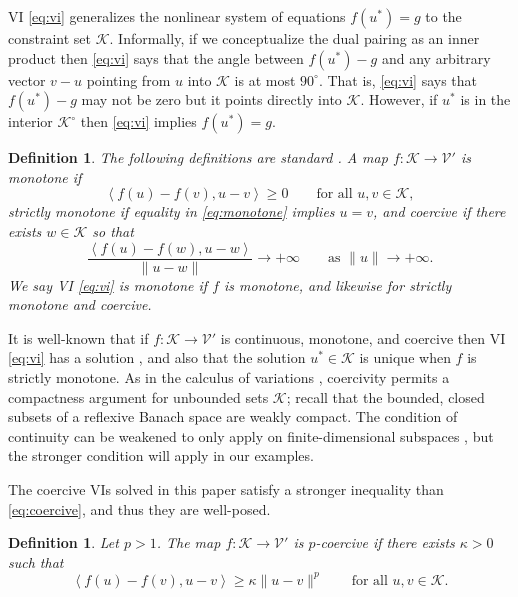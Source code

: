 \documentclass[letterpaper,final,12pt,reqno]{amsart}
\theoremstyle{cstyle}
\theoremstyle{cstyle*}
\theoremstyle{dstyle}
\newtheorem{definition}[theorem]{Definition}
\numberwithin{equation}{section}
\numberwithin{figure}{section}
\numberwithin{table}{section}
\numberwithin{theorem}{section}
\newcommand{\cK}{\mathcal{K}}
\newcommand{\cV}{\mathcal{V}}
\newcommand{\ip}[2]{\left<#1,#2\right>}
\begin{document}
VI \eqref{eq:vi} generalizes the nonlinear system of equations $f(u^*)=g$ to the constraint set $\cK$.  Informally, if we conceptualize the dual pairing as an inner product then \eqref{eq:vi} says that the angle between $f(u^*)-g$ and any arbitrary vector $v-u$ pointing from $u$ into $\cK$ is at most $90^\circ$.  That is, \eqref{eq:vi} says that $f(u^*)-g$ may not be zero but it points directly into $\cK$.  However, if $u^*$ is in the interior $\cK^\circ$ then \eqref{eq:vi} implies $f(u^*)=g$.

\begin{definition} The following definitions are standard \cite{KinderlehrerStampacchia1980}.  A map $f:\cK \to \cV'$ is \emph{monotone} if
\begin{equation}
\ip{f(u)-f(v)}{u-v} \ge 0 \qquad \text{for all } u,v \in \cK, \label{eq:monotone}
\end{equation}
\emph{strictly monotone} if equality in \eqref{eq:monotone} implies $u=v$, and \emph{coercive} if there exists $w \in \cK$ so that
\begin{equation}
\frac{\ip{f(u)-f(w)}{u-w}}{\|u-w\|} \to +\infty \qquad \text{as } \|u\|\to +\infty. \label{eq:coercive}
\end{equation}
We say VI \eqref{eq:vi} is \emph{monotone} if $f$ is monotone, and likewise for strictly monotone and coercive. \end{definition}

It is well-known that if $f:\cK \to \cV'$ is continuous, monotone, and coercive then VI \eqref{eq:vi} has a solution \cite[Corollary III.1.8]{KinderlehrerStampacchia1980}, and also that the solution $u^* \in \cK$ is unique when $f$ is strictly monotone.  As in the calculus of variations \cite{Evans2010}, coercivity permits a compactness argument for unbounded sets $\cK$; recall that the bounded, closed subsets of a reflexive Banach space are weakly compact.  The condition of continuity can be weakened to only apply on finite-dimensional subspaces \cite{KinderlehrerStampacchia1980}, but the stronger condition will apply in our examples.

The coercive VIs solved in this paper satisfy a stronger inequality than \eqref{eq:coercive}, and thus they are well-posed.

\begin{definition}  Let $p>1$.  The map $f:\cK \to \cV'$ is \emph{$p$-coercive} if there exists $\kappa>0$ such that
\begin{equation}
\ip{f(u)-f(v)}{u-v} \ge \kappa \|u-v\|^p \qquad \text{for all } u,v \in \cK. \label{eq:pcoercive}
\end{equation}
\end{definition}
\end{document}
